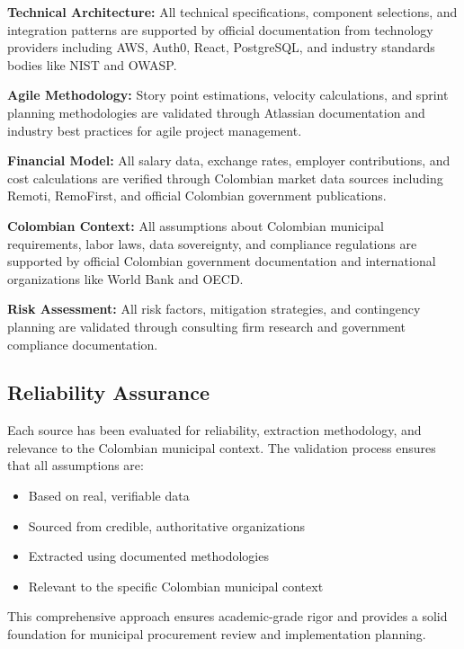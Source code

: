 \documentclass[12pt,a4paper]{article}
\begin{document}
\textbf{Technical Architecture:}
All technical specifications, component selections, and integration patterns are supported by official documentation from technology providers including AWS, Auth0, React, PostgreSQL, and industry standards bodies like NIST and OWASP.

\textbf{Agile Methodology:}
Story point estimations, velocity calculations, and sprint planning methodologies are validated through Atlassian documentation and industry best practices for agile project management.

\textbf{Financial Model:}
All salary data, exchange rates, employer contributions, and cost calculations are verified through Colombian market data sources including Remoti, RemoFirst, and official Colombian government publications.

\textbf{Colombian Context:}
All assumptions about Colombian municipal requirements, labor laws, data sovereignty, and compliance regulations are supported by official Colombian government documentation and international organizations like World Bank and OECD.

\textbf{Risk Assessment:}
All risk factors, mitigation strategies, and contingency planning are validated through consulting firm research and government compliance documentation.

\subsection{Reliability Assurance}

Each source has been evaluated for reliability, extraction methodology, and relevance to the Colombian municipal context. The validation process ensures that all assumptions are:
\begin{itemize}
    \item Based on real, verifiable data
    \item Sourced from credible, authoritative organizations
    \item Extracted using documented methodologies
    \item Relevant to the specific Colombian municipal context
\end{itemize}

This comprehensive approach ensures academic-grade rigor and provides a solid foundation for municipal procurement review and implementation planning.
\end{document}
